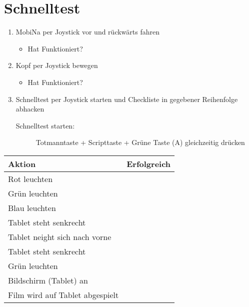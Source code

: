 \documentclass[11pt]{article} %
\newcommand{\mb}{MobiNa}
\begin{document}
\clearpage
\newpage
\begin{minipage}{\textwidth}

\section{Schnelltest}\label{check}

\begin{enumerate}
\item \mb{} per Joystick vor und rückwärts fahren
	\begin{itemize}[label={\Square}] 
	\item Hat Funktioniert?
	\end{itemize}

\item Kopf per Joystick bewegen
	\begin{itemize}[label={\Square}] 
	\item Hat Funktioniert?
	\end{itemize}

\item Schnelltest per Joystick starten und Checkliste in gegebener Reihenfolge abhacken
	\begin{description}
	\item[Schnelltest starten:] Totmanntaste + Scripttaste + Grüne Taste (A) gleichzeitig drücken
	\end{description}

\end{enumerate}

\begin{tabular}{| l | c |}
    \hline
    \textbf{Aktion} &\textbf{Erfolgreich} \\ \hline
    Rot leuchten &  \\ \hline
    Grün leuchten &  \\ \hline
    Blau leuchten &  \\ \hline
    Tablet steht senkrecht &  \\ \hline
    Tablet neight sich nach vorne &  \\ \hline
    Tablet steht senkrecht &  \\ \hline
    Grün leuchten &  \\ \hline
    Bildschirm (Tablet) an &  \\ \hline
    Film wird auf Tablet abgespielt &  \\
    \hline
  \end{tabular}

\end{minipage}
\end{document}
